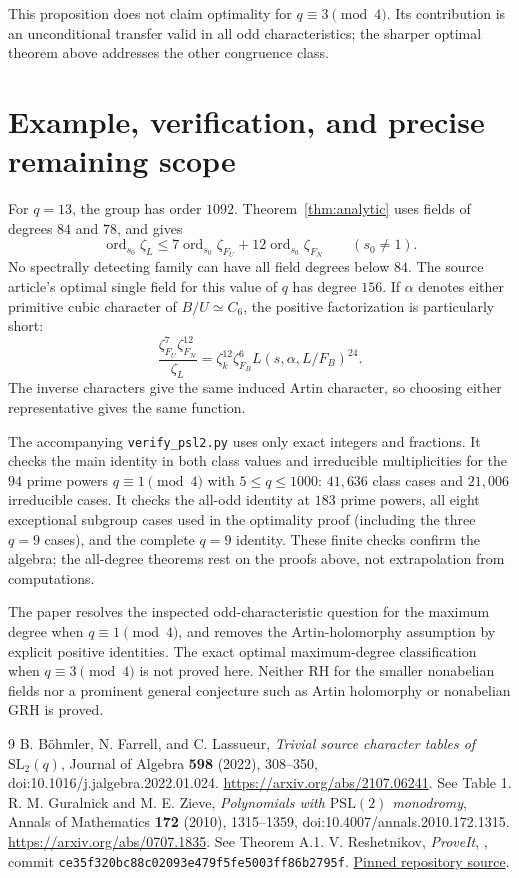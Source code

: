 \documentclass[11pt]{article}
\theoremstyle{remark}\newtheorem{remark}[theorem]{Remark}
\newcommand{\ord}{\operatorname{ord}}
\begin{document}
This proposition does not claim optimality for $q\equiv3\pmod4$.
Its contribution is an unconditional transfer valid in all odd
characteristics; the sharper optimal theorem above addresses the other
congruence class.

\section{Example, verification, and precise remaining scope}
For $q=13$, the group has order $1092$. Theorem~\ref{thm:analytic}
uses fields of degrees $84$ and $78$, and gives
\[
 \ord_{s_0}\zeta_L\le7\ord_{s_0}\zeta_{F_U}
                       +12\ord_{s_0}\zeta_{F_N}\qquad(s_0\ne1).
\]
No spectrally detecting family can have all field degrees below $84$.
The source article's optimal single field for this value of $q$ has
degree $156$. If $\alpha$ denotes either primitive cubic character of
$B/U\simeq C_6$, the positive factorization is particularly short:
\[
 \frac{\zeta_{F_U}^{7}\zeta_{F_N}^{12}}{\zeta_L}
   =\zeta_k^{12}\zeta_{F_B}^{6}L(s,\alpha,L/F_B)^{24}.
\]
The inverse characters give the same induced Artin character, so choosing
either representative gives the same function.

The accompanying \texttt{verify\_psl2.py} uses only exact integers and
fractions. It checks the main identity in both class values and
irreducible multiplicities for the $94$ prime powers
$q\equiv1\pmod4$ with $5\le q\le1000$: $41{,}636$ class cases and
$21{,}006$ irreducible cases. It checks the all-odd identity at $183$
prime powers, all eight exceptional subgroup cases used in the
optimality proof (including the three $q=9$ cases), and the complete
$q=9$ identity. These finite checks confirm the algebra; the all-degree
theorems rest on the proofs above, not extrapolation from computations.

The paper resolves the inspected odd-characteristic question for the
maximum degree when $q\equiv1\pmod4$, and removes the Artin-holomorphy
assumption by explicit positive identities. The exact optimal
maximum-degree classification when $q\equiv3\pmod4$ is not proved here.
Neither RH for the smaller nonabelian fields nor a prominent general
conjecture such as Artin holomorphy or nonabelian GRH is proved.

\begin{thebibliography}{9}
B. B\"ohmler, N. Farrell, and C. Lassueur,
\emph{Trivial source character tables of $\mathrm{SL}_2(q)$},
Journal of Algebra \textbf{598} (2022), 308--350,
doi:10.1016/j.jalgebra.2022.01.024.
\url{https://arxiv.org/abs/2107.06241}. See Table 1.
R. M. Guralnick and M. E. Zieve,
\emph{Polynomials with $\mathrm{PSL}(2)$ monodromy},
Annals of Mathematics \textbf{172} (2010), 1315--1359,
doi:10.4007/annals.2010.172.1315.
\url{https://arxiv.org/abs/0707.1835}. See Theorem A.1.
V. Reshetnikov, \emph{ProveIt},
,
commit \texttt{ce35f320bc88c02093e479f5fe5003ff86b2795f}.
\href{https://github.com/VladimirReshetnikov/ProveIt/tree/ce35f320bc88c02093e479f5fe5003ff86b2795f/Analysis/GeneralizedRiemannHypothesis/}{Pinned repository source}.
\end{thebibliography}
\end{document}
